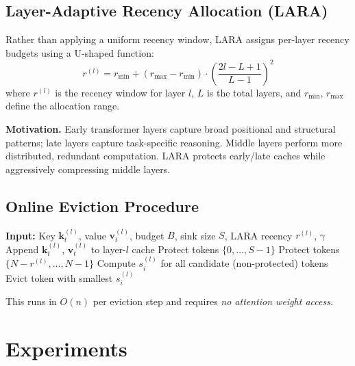 \documentclass{article}
\begin{document}
\subsection{Layer-Adaptive Recency Allocation (LARA)}

Rather than applying a uniform recency window, LARA assigns per-layer recency budgets using a U-shaped function:
\begin{equation}
    r^{(l)} = r_{\min} + (r_{\max} - r_{\min}) \cdot \left(\frac{2l - L + 1}{L - 1}\right)^2
\end{equation}
where $r^{(l)}$ is the recency window for layer $l$, $L$ is the total layers, and $r_{\min}$, $r_{\max}$ define the allocation range.

\textbf{Motivation.} Early transformer layers capture broad positional and structural patterns; late layers capture task-specific reasoning. Middle layers perform more distributed, redundant computation. LARA protects early/late caches while aggressively compressing middle layers.

\subsection{Online Eviction Procedure}

\begin{algorithm}[t]
\caption{EntropyKV Online Eviction with VW-Norm + LARA}
\begin{algorithmic}[1]
\State \textbf{Input:} Key $\mathbf{k}_t^{(l)}$, value $\mathbf{v}_t^{(l)}$, budget $B$, sink size $S$, LARA recency $r^{(l)}$, $\gamma$
\State Append $\mathbf{k}_t^{(l)}$, $\mathbf{v}_t^{(l)}$ to layer-$l$ cache
    \State Protect tokens $\{0, \dots, S{-}1\}$ 
    \State Protect tokens $\{N{-}r^{(l)}, \dots, N{-}1\}$ 
    \State Compute $s_i^{(l)}$ for all candidate (non-protected) tokens
    \State Evict token with smallest $s_i^{(l)}$
\EndIf
\end{algorithmic}
\end{algorithm}

This runs in $O(n)$ per eviction step and requires \emph{no attention weight access}.

\section{Experiments}
\end{document}
